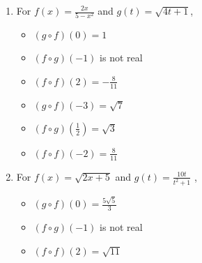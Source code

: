 \begin{enumerate}
\begin{multicols}{3}
\begin{itemize}
\end{itemize}

\end{multicols}

\item  For  $f(x) = \frac{2x}{5-x^2}$ and $g(t) = \sqrt{4t+1}$,
\begin{multicols}{3}

\begin{itemize}

\item  $(g\circ f)(0) = 1$

\item  $(f\circ g)(-1)$ is not real

\item  $(f \circ f)(2) = -\frac{8}{11}$

\end{itemize}

\end{multicols}

\begin{multicols}{3}

\begin{itemize}

\item  $(g\circ f)(-3) = \sqrt{7}$

\item  $(f\circ g)\left(\frac{1}{2}\right) = \sqrt{3}$

\item  $(f \circ f)(-2) = \frac{8}{11}$

\end{itemize}

\end{multicols}

\item  For  $f(x) =\sqrt{2x+5}$ and $g(t) = \frac{10t}{t^2+1}$ ,
\begin{multicols}{3}

\begin{itemize}

\item  $(g\circ f)(0) = \frac{5\sqrt{5}}{3}$

\item  $(f\circ g)(-1)$ is not real

\item  $(f \circ f)(2) = \sqrt{11}$

\end{itemize}

\end{multicols}


\end{enumerate}
